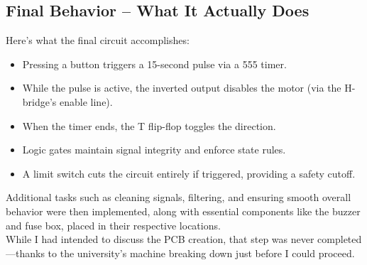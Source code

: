 \documentclass{article}
\begin{document}
\subsection{Final Behavior -- What It Actually Does}
Here’s what the final circuit accomplishes:
\begin{itemize}[itemsep=-1mm]
	\item Pressing a {button} triggers a 15-second pulse via a {555 timer}.
	\item While the pulse is active, the {inverted output} disables the motor (via the H-bridge's enable line).
	\item When the timer ends, the {T flip-flop toggles} the direction.
	\item Logic gates maintain signal integrity and enforce state rules.
	\item A {limit switch} cuts the circuit entirely if triggered, providing a safety cutoff.
\end{itemize}
Additional tasks such as cleaning signals, filtering, and ensuring smooth overall behavior were then implemented, along with essential components like the buzzer and fuse box, placed in their respective locations.\\[8pt]
While I had intended to discuss the PCB creation, that step was never completed---thanks to the university's machine breaking down just before I could proceed.



\newpage
\end{document}
